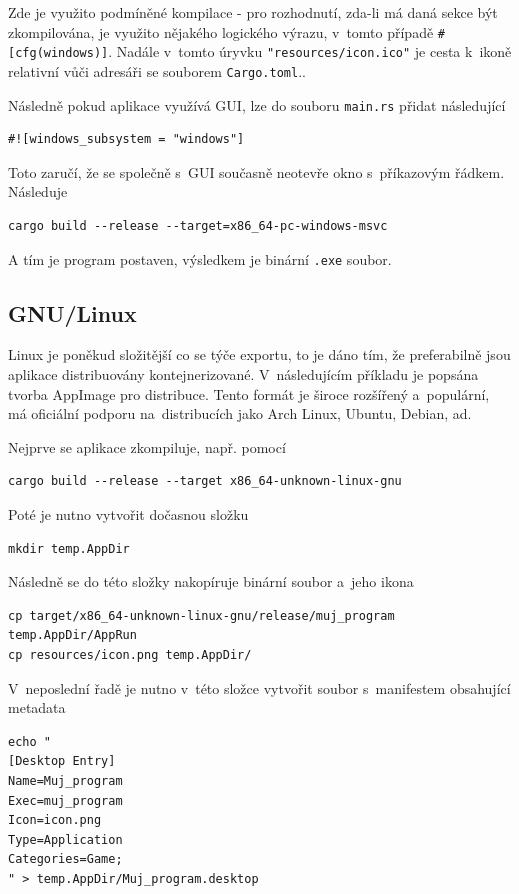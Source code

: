 \documentclass[a4paper, 12pt]{article} %
\newcommand{\rust}[1]{\texttt{#1}}
\begin{document}
		Zde je využito podmíněné kompilace - pro rozhodnutí, zda-li má daná sekce být zkompilována, je využito nějakého logického výrazu, v~tomto případě \texttt{#[cfg(windows)]}. Nadále v~tomto úryvku \rust{"resources/icon.ico"} je cesta k~ikoně relativní vůči adresáři se souborem \texttt{Cargo.toml}.\cite{comp_win_ico}.
		
		Následně pokud aplikace využívá GUI, lze do souboru \texttt{main.rs} přidat následující
		\begin{verbatim}
#![windows_subsystem = "windows"]
		\end{verbatim}
		
		Toto zaručí, že se společně s~GUI současně neotevře okno s~příkazovým řádkem. Následuje
		\begin{verbatim}
cargo build --release --target=x86_64-pc-windows-msvc
		\end{verbatim}
		
		A tím je program postaven, výsledkem je binární \texttt{.exe} soubor.\cite{winexport}


	\subsection{GNU/Linux}
		Linux je poněkud složitější co se týče exportu, to je dáno tím, že preferabilně jsou aplikace distribuovány kontejnerizované. V~následujícím příkladu je popsána tvorba AppImage pro distribuce. Tento formát je široce rozšířený a~populární, má oficiální podporu na~distribucích jako Arch Linux, Ubuntu, Debian, ad.\cite{appimage}

		Nejprve se aplikace zkompiluje, např. pomocí
		\begin{verbatim}
cargo build --release --target x86_64-unknown-linux-gnu
		\end{verbatim}

		Poté je nutno vytvořit dočasnou složku
		\begin{verbatim}
mkdir temp.AppDir
		\end{verbatim}
		
		Následně se do této složky nakopíruje binární soubor a~jeho ikona
		\begin{verbatim}
cp target/x86_64-unknown-linux-gnu/release/muj_program temp.AppDir/AppRun
cp resources/icon.png temp.AppDir/
		\end{verbatim}
		
		V~neposlední řadě je nutno v~této složce vytvořit soubor s~manifestem obsahující metadata
		\begin{verbatim}
echo "
[Desktop Entry]
Name=Muj_program
Exec=muj_program
Icon=icon.png
Type=Application
Categories=Game;
" > temp.AppDir/Muj_program.desktop
		\end{verbatim}
\end{document}
